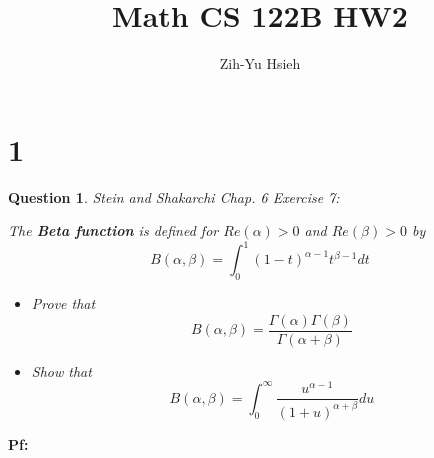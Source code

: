 \documentclass{article}
\title{Math CS 122B HW2}
\author{Zih-Yu Hsieh}
\newtheorem{question}{Question}
\begin{document}
\maketitle

\section*{1}
\begin{myBox}[]{}
    \begin{question}
        Stein and Shakarchi Chap. 6 Exercise 7:

        The \textbf{Beta function} is defined for $Re(\alpha)>0$ and $Re(\beta)>0$ by
        $$B(\alpha,\beta)=\int_{0}^{1}(1-t)^{\alpha-1}t^{\beta-1}dt$$
        \begin{itemize}
            \item[(a)] Prove that 
            $$B(\alpha,\beta)=\frac{\Gamma(\alpha)\Gamma(\beta)}{\Gamma(\alpha+\beta)}$$
            \item[(b)] Show that
            $$B(\alpha,\beta)=\int_{0}^{\infty}\frac{u^{\alpha-1}}{(1+u)^{\alpha+\beta}}du$$
        \end{itemize}
    \end{question}
\end{myBox}

\textbf{Pf:}
\end{document}
